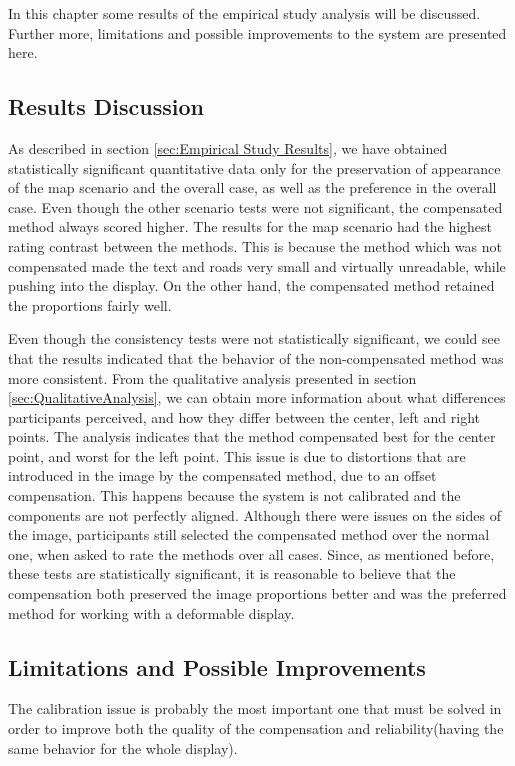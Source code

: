 \documentclass[]{article}
\begin{document}
In this chapter some results of the empirical study analysis will be discussed. Further more, limitations and possible improvements to the system are presented here.

\subsection{Results Discussion}

As described in section \ref{sec:Empirical Study Results}, we have obtained statistically significant quantitative data only for the preservation of appearance of the map scenario and the overall case, as well as the preference in the overall case. Even though the other scenario tests were not significant, the compensated method always scored higher. The results for the map scenario had the highest rating contrast between the methods. This is because the method which was not compensated made the text and roads very small and virtually unreadable, while pushing into the display. On the other hand, the compensated method retained the proportions fairly well.

Even though the consistency tests were not statistically significant, we could see that the results indicated that the behavior of the non-compensated method was more consistent. From the qualitative analysis presented in section \ref{sec:QualitativeAnalysis}, we can obtain more information about what differences participants perceived, and how they differ between the center, left and right points. The analysis indicates that the method compensated best for the center point, and worst for the left point. This issue is due to distortions that are introduced in the image by the compensated method, due to an offset compensation. This happens because the system is not calibrated and the components are not perfectly aligned. Although there were issues on the sides of the image, participants still selected the compensated method over the normal one, when asked to rate the methods over all cases. Since, as mentioned before, these tests are statistically significant, it is reasonable to believe that the compensation both preserved the image proportions better and was the preferred method for working with a deformable display.

\subsection{Limitations and Possible Improvements}

The calibration issue is probably the most important one that must be solved in order to improve both the quality of the compensation and reliability(having the same behavior for the whole display). 
\end{document}
